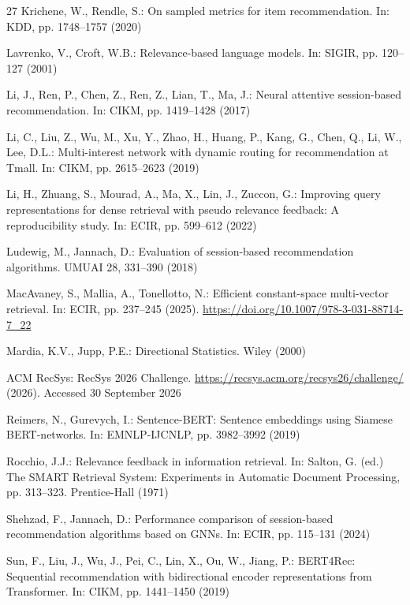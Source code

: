 \documentclass[runningheads]{llncs}
\begin{document}
\begin{thebibliography}{27}
Krichene, W., Rendle, S.:
On sampled metrics for item recommendation.
In: KDD, pp. 1748--1757 (2020)

Lavrenko, V., Croft, W.B.:
Relevance-based language models. In: SIGIR, pp. 120--127 (2001)

Li, J., Ren, P., Chen, Z., Ren, Z., Lian, T., Ma, J.:
Neural attentive session-based recommendation.
In: CIKM, pp. 1419--1428 (2017)

Li, C., Liu, Z., Wu, M., Xu, Y., Zhao, H., Huang, P., Kang, G., Chen, Q.,
Li, W., Lee, D.L.:
Multi-interest network with dynamic routing for recommendation at Tmall.
In: CIKM, pp. 2615--2623 (2019)

Li, H., Zhuang, S., Mourad, A., Ma, X., Lin, J., Zuccon, G.:
Improving query representations for dense retrieval with pseudo relevance
feedback: A reproducibility study. In: ECIR, pp. 599--612 (2022)

Ludewig, M., Jannach, D.:
Evaluation of session-based recommendation algorithms.
UMUAI 28, 331--390 (2018)

MacAvaney, S., Mallia, A., Tonellotto, N.:
Efficient constant-space multi-vector retrieval.
In: ECIR, pp. 237--245 (2025).
\url{https://doi.org/10.1007/978-3-031-88714-7_22}

Mardia, K.V., Jupp, P.E.:
Directional Statistics. Wiley (2000)

ACM RecSys:
RecSys 2026 Challenge.
\url{https://recsys.acm.org/recsys26/challenge/} (2026).
Accessed 30 September 2026

Reimers, N., Gurevych, I.:
Sentence-BERT: Sentence embeddings using Siamese BERT-networks.
In: EMNLP-IJCNLP, pp. 3982--3992 (2019)

Rocchio, J.J.:
Relevance feedback in information retrieval.
In: Salton, G. (ed.) The SMART Retrieval System: Experiments in Automatic
Document Processing, pp. 313--323.
Prentice-Hall (1971)

Shehzad, F., Jannach, D.:
Performance comparison of session-based recommendation algorithms based on
GNNs. In: ECIR, pp. 115--131 (2024)

Sun, F., Liu, J., Wu, J., Pei, C., Lin, X., Ou, W., Jiang, P.:
BERT4Rec: Sequential recommendation with bidirectional encoder representations
from Transformer. In: CIKM, pp. 1441--1450 (2019)


\end{thebibliography}
\end{document}
